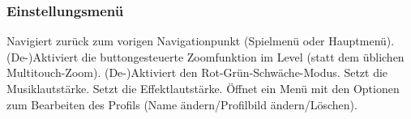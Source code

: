 \begin{center}
\setlength\fboxsep{20pt}
\setlength\fboxrule{1pt}
\end{center}

\subsubsection{Einstellungsmenü}
\begin{requirements}
 Navigiert zurück zum vorigen Navigationpunkt (Spielmenü oder Hauptmenü).
 (De-)Aktiviert die buttongesteuerte Zoomfunktion im Level (statt dem üblichen Multitouch-Zoom).
 (De-)Aktiviert den Rot-Grün-Schwäche-Modus.
 Setzt die Musiklautstärke.
 Setzt die Effektlautstärke.
 Öffnet ein Menü mit den Optionen zum Bearbeiten des Profils (Name ändern/Profilbild ändern/Löschen).
\end{requirements}

\begin{center}
\setlength\fboxsep{20pt}
\setlength\fboxrule{1pt}
\end{center}

